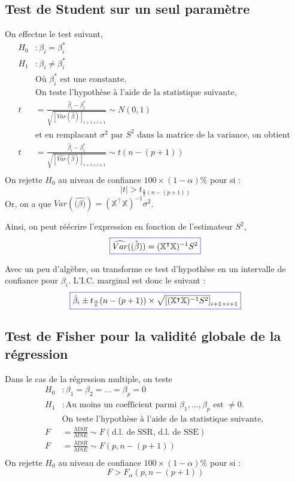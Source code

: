 \documentclass[11pt,french]{report}
\begin{document}
\subsection{Test de Student sur un seul paramètre}
On effectue le test suivant, 
\begin{align*}
H_0 &: \beta_i = \beta_i^* \\
H_1 &: \beta_i \neq \beta_i^* \\
&\text{Où $\beta_i^*$ est une constante.} \\
&\text{On teste l'hypothèse à l'aide de la statistique suivante, } \\
t &= \frac{\hat{\beta}_i - \beta_i^* }{\sqrt{[{Var}(\hat{\beta})]_{i+1 \times i+1}}} \sim N(0, 1) \\
&\text{et en remplacant $\sigma^2$ par $S^2$ dans la matrice de la variance, on obtient }\\
t &= \frac{\hat{\beta}_i - \beta_i^* }{\sqrt{[\widehat{Var}(\hat{\beta})]_{i+1 \times i+1}}} \sim t(n-(p+1)) \\
\end{align*}
On rejette $H_0$ au niveau de confiance $100 \times (1 - \alpha)\%$ pour si :
$$
|t| > t_{\frac{\alpha}{2}(n-(p+1))}
$$
Or, on a que $Var(\hat{\mathbb(\beta)}) = (\mathbb{X}^\intercal\mathbb{X})^{-1}\sigma^2$. \newline

Ainsi, on peut réécrire l'expression en fonction de l'estimateur $S^2$, 
\begin{equation}
\label{eq:varmulti}
\color{blue}
\boxed{\color{black}
\widehat{Var}(\hat{\mathbb(\beta)}) = (\mathbb{X}^\intercal\mathbb{X})^{-1}S^2}
\end{equation}

Avec un peu d'algèbre, on transforme ce test d'hypothèse en un intervalle de confiance pour $\beta_i$. L'I.C. marginal est donc le suivant :
\begin{equation}
\label{eq:ICmulti}
\color{blue}
\boxed{\color{black}
\hat{\beta}_i \pm t_{\frac{\alpha}{n}}(n - (p+1)) \times \sqrt{[(\mathbb{X}^\intercal\mathbb{X})^{-1}S^2]}_{i+1 \times i+1} }
\end{equation}

\subsection{Test de Fisher pour la validité globale de la régression}
\label{sec:fisherT}
Dans le cas de la régression multiple, on teste 
\begin{align*}
H_0 &: \beta_1 = \beta_2 = ... = \beta_p = 0 \\
H_1 &: \text{Au moins un coefficient parmi $\beta_1,...,\beta_p$ est $\neq 0$.} \\
&\text{On teste l'hypothèse à l'aide de la statistique suivante, } \\
F &= \frac{MSR}{MSE} \sim F(\text{d.l. de SSR, d.l. de SSE}) \\
F &= \frac{MSR}{MSE} \sim F(p, n - (p+1)) \\
\end{align*}
On rejette $H_0$ au niveau de confiance $100 \times (1 - \alpha)\%$ pour si :
$$
F > F_{\alpha}(p, n-(p+1))
$$
\end{document}
